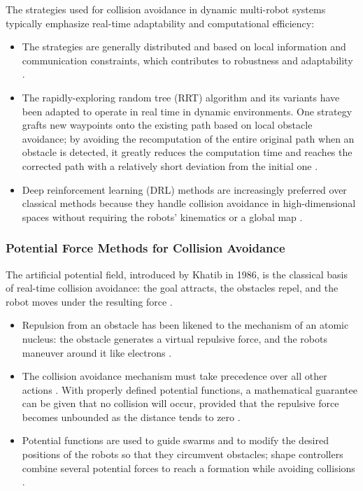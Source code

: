 The strategies used for collision avoidance in dynamic multi-robot systems
typically emphasize real-time adaptability and computational efficiency:
\begin{itemize}
  \item {} The strategies are generally distributed and
        based on local information and communication constraints, which
        contributes to robustness and adaptability \cite{oh2025survey}.
  \item {} The rapidly-exploring random tree (RRT)
        algorithm and its variants have been adapted to operate in real time in
        dynamic environments. One strategy grafts new waypoints onto the
        existing path based on local obstacle avoidance; by avoiding the
        recomputation of the entire original path when an obstacle is detected,
        it greatly reduces the computation time and reaches the corrected path
        with a relatively short deviation from the initial one \cite{li2021rrt}.
  \item {} Deep reinforcement learning (DRL) methods
        are increasingly preferred over classical methods because they handle
        collision avoidance in high-dimensional spaces without requiring the
        robots' kinematics or a global map \cite{zhang2025deep,huttenrauch2019deep}.
\end{itemize}

\subsubsection{Potential Force Methods for Collision Avoidance}

The artificial potential field, introduced by Khatib in 1986, is the classical
basis of real-time collision avoidance: the goal attracts, the obstacles repel,
and the robot moves under the resulting force \cite{khatib1986real}.
\begin{itemize}
  \item {} Repulsion from an obstacle has been likened to
        the mechanism of an atomic nucleus: the obstacle generates a virtual
        repulsive force, and the robots maneuver around it like electrons
        \cite{tan2016handbook}.
  \item {} The collision avoidance mechanism must take
        precedence over all other actions \cite{sahin2007swarm}. With properly
        defined potential functions, a mathematical guarantee can be given that
        no collision will occur, provided that the repulsive force becomes
        unbounded as the distance tends to zero \cite{khatib1986real}.
  \item {} Potential functions are used to guide swarms
        and to modify the desired positions of the robots so that they circumvent
        obstacles; shape controllers combine several potential forces to reach a
        formation while avoiding collisions \cite{tan2016handbook}.
\end{itemize}

